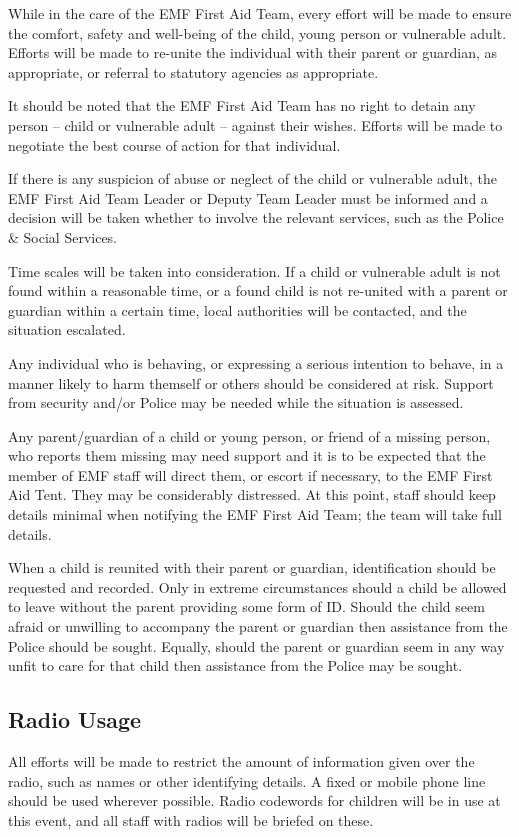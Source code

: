While in the care of the EMF First Aid Team, every effort will be made to
ensure the comfort, safety and well-being of the child, young person or
vulnerable adult. Efforts will be made to re-unite the
individual with their parent or guardian, as appropriate, or referral to
statutory agencies as appropriate.

It should be noted that the EMF First Aid Team has no right to detain any
person -- child or vulnerable adult -- against their wishes. Efforts will 
be made to negotiate the best course of action for that individual.

If there is any suspicion of abuse or neglect of the child or vulnerable adult,
the EMF First Aid Team Leader or Deputy Team Leader must be informed and a
decision will be taken whether to involve the relevant services, such as the
Police \& Social Services.

Time scales will be taken into consideration. If a child or vulnerable adult is
not found within a reasonable time, or a found child is not re-united with a
parent or guardian within a certain time, local authorities will be contacted,
and the situation escalated.

Any individual who is behaving, or expressing a serious intention to behave, in
a manner likely to harm themself or others should be considered at risk.
Support from security and/or Police may be needed while the situation is
assessed.

Any parent/guardian of a child or young person, or friend of a missing person,
who reports them missing may need support and it is to be expected that the
member of EMF staff will direct them, or escort if necessary, to the EMF First
Aid Tent. They may be considerably distressed. At this point, staff should keep
details minimal when notifying the EMF First Aid Team; the team will take full
details.

When a child is reunited with their parent or guardian, identification should be
requested and recorded. Only in extreme circumstances should a child be
allowed to leave without the parent providing some form of ID. Should the child
seem afraid or unwilling to accompany the parent or guardian then assistance
from the Police should be sought. Equally, should the parent or guardian
seem in any way unfit to care for that child then assistance from the
Police may be sought.

\subsection{Radio Usage}
All efforts will be made to restrict the amount of information given over the
radio, such as names or other identifying details. A fixed or mobile phone line
should be used wherever possible. Radio codewords for children will be in
use at this event, and all staff with radios will be briefed on these.

